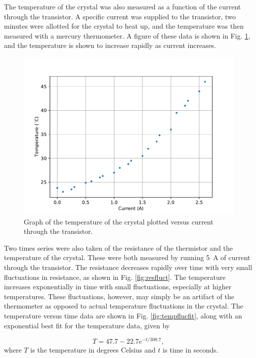 The temperature of the crystal was also measured as a function of the current through the transistor. A specific current was supplied to the transistor, two minutes were allotted for the crystal to heat up, and the temperature was then measured with a mercury thermometer. A figure of these data is shown in Fig. \ref{fig:tvsi}, and the temperature is shown to increase rapidly as current increases.

\begin{figure}[h!]
  \centering
  \includegraphics[width = .8\textwidth]{Images/TvsI.pdf}
  \caption{Graph of the temperature of the crystal plotted versus current through the transistor.}
  \label{fig:tvsi}
\end{figure}


Two times series were also taken of the resistance of the thermistor and the temperature of the crystal. These were both measured by running \SI{5}{ A} of current through the transistor. The resistance decreases rapidly over time with very small fluctuations in resistance, as shown in Fig. \ref{fig:resfluct}. The temperature increases exponentially in time with small fluctuations, especially at higher temperatures. These fluctuations, however, may simply be an artifact of the thermometer as opposed to actual temperature fluctuations in the crystal. The temperature versus time data are shown in Fig. \ref{fig:tempflucfit}, along with an exponential best fit for the temperature data, given by

\begin{equation}
	T = 47.7 - 22.7 e^{-t/308.7},
	\label{eq:temptime}
\end{equation}
%
where $T$ is the temperature in degrees Celsius and $t$ is time in seconds.


